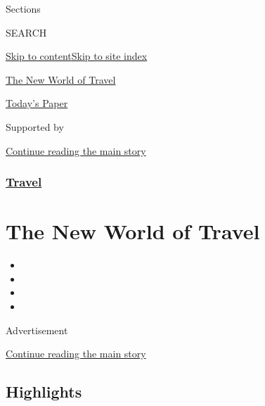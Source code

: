 Sections

SEARCH

\protect\hyperlink{site-content}{Skip to
content}\protect\hyperlink{site-index}{Skip to site index}

\href{https://www.nytimes3xbfgragh.onion/spotlight/the-new-world-of-travel}{The
New World of Travel}

\href{https://myaccount.nytimes3xbfgragh.onion/auth/login?response_type=cookie\&client_id=vi}{}

\href{https://www.nytimes3xbfgragh.onion/section/todayspaper}{Today's
Paper}

Supported by

\protect\hyperlink{after-sponsor}{Continue reading the main story}

\hypertarget{travel}{%
\subsubsection{\texorpdfstring{\href{/section/travel}{Travel}}{Travel}}\label{travel}}

\hypertarget{the-new-world-of-travel}{%
\section{The New World of Travel}\label{the-new-world-of-travel}}

\begin{itemize}
\item
\item
\item
\item
\end{itemize}

Advertisement

\protect\hyperlink{after-subheader}{Continue reading the main story}

\hypertarget{highlights}{%
\subsection{Highlights}\label{highlights}}

